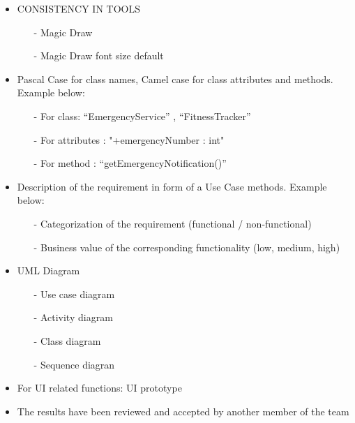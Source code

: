 \documentclass{article}
\begin{document}
\begin{itemize}
\item
  CONSISTENCY IN TOOLS
  \begin{itemize}
	\item[-] Magic Draw
	\item[-] Magic Draw font size default
   \end{itemize}
\end{itemize}


\begin{itemize}
\item
  Pascal Case for class names, Camel case for class attributes and
  methods. Example below:
  \begin{itemize}
	\item[-] For class: ``EmergencyService'' , ``FitnessTracker''
	\item[-] For attributes : "+emergencyNumber : int"
	\item[-] For method : ``getEmergencyNotification()''
   \end{itemize}
\end{itemize}

\begin{itemize}
\item
  Description of the requirement in form of a Use Case
  methods. Example below:
  \begin{itemize}
	\item[-] Categorization of the requirement (functional / non-functional)
	\item[-] Business value of the corresponding functionality (low, medium, high)
   \end{itemize}
\end{itemize}

\begin{itemize}
\item
  UML Diagram
  \begin{itemize}
	\item[-] Use case diagram
	\item[-] Activity diagram
	\item[-] Class diagram
	\item[-] Sequence diagran
   \end{itemize}
\end{itemize}

\begin{itemize}
\item
  For UI related functions: UI prototype
\item
  The results have been reviewed and accepted by another member of the
  team
\end{itemize}
\end{document}
